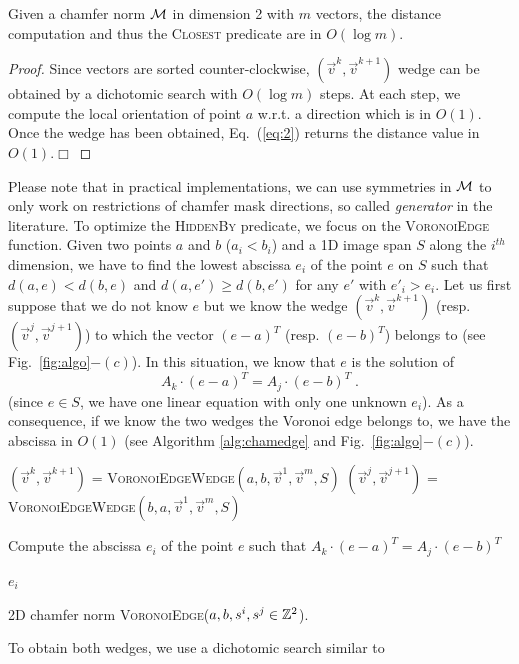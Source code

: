 \documentclass{llncs}
\begin{document}
\begin{lemma}
\label{lem:log}
  Given a chamfer norm $\mathcal{M}$ in dimension 2 with $m$ vectors, the distance computation
  and thus the \textsc{Closest} predicate are in $O(\log{m})$.
\end{lemma}
\begin{proof}
  Since vectors are sorted counter-clockwise,
  $(\vec{v}^k,\vec{v}^{k+1})$ wedge can be obtained by a dichotomic
  search with $O(\log{m})$ steps. At each step, we compute the local
  orientation of point $a$ w.r.t. a direction which is in $O(1)$. Once
  the wedge has been obtained, Eq.~(\ref{eq:2}) returns the distance
  value in $O(1)$.$\Box$
\end{proof}

Please note that in practical implementations, we can use symmetries
in $\mathcal{M}$  to only work on restrictions of chamfer mask
directions, so called \emph{generator} in the literature.  To optimize the \textsc{HiddenBy} predicate, we focus on
the \textsc{VoronoiEdge} function. Given two points $a$ and $b$
($a_i<b_i$) and a 1D image span $S$ along the $i^{th}$ dimension, we
have to find the lowest abscissa $e_i$ of the point $e$ on $S$ such
that $d(a,e) < d(b,e)$ and $d(a,e')\geq d(b, e')$ for any $e'$ with
$e'_i>e_i$.
Let us first suppose that we do not know $e$ but we know the  wedge
$(\vec{v}^{k},\vec{v}^{k+1})$ (resp. $(\vec{v}^j,\vec{v}^{j+1})$) to which the vector $(e-a)^T$ (resp. $(e-b)^T$) belongs to (see
Fig.~\ref{fig:algo}$-(c)$). In this situation, we know that $e$ is the
solution of
\begin{equation}
\label{eq:3}
  A_k\cdot  (e-a)^T = A_j\cdot (e -b)^T\;.
\end{equation}
(since $e\in S$, we have one linear equation with only one unknown
$e_i$). As a consequence, if we know the two wedges the Voronoi edge
belongs to, we have the abscissa in $O(1)$ (see Algorithm
\ref{alg:chamedge} and Fig.~\ref{fig:algo}$-(c)$).
\begin{algorithm}[h]\footnotesize
  $(\vec{v}^k,\vec{v}^{k+1})$ = \textsc{VoronoiEdgeWedge}$(a,b,\vec{v}^1,\vec{v}^m, S)$\;
  $(\vec{v}^j,\vec{v}^{j+1})$ = \textsc{VoronoiEdgeWedge}$(b,a,\vec{v}^1,\vec{v}^m, S)$\;

  Compute the abscissa $e_i$ of the point $e$ such that $A_k\cdot
  (e-a)^T = A_j\cdot (e -b)^T$\;

  \Return $e_i$\;
  \caption{\footnotesize
2D chamfer norm \textsc{VoronoiEdge}($a,b,s^i,s^j\in{\mathbb{Z}}^2$).\label{alg:chamedge}}
\end{algorithm}
To obtain both wedges, we use a dichotomic search similar to
\end{document}
